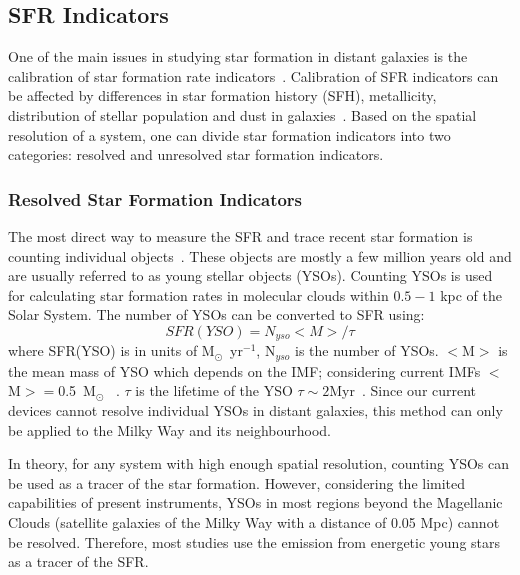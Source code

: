 \subsection{SFR Indicators}

One of the main issues in studying star formation in distant galaxies is the calibration of star formation rate indicators~\citep[e.g.,][]{Lee10}. 
Calibration of SFR indicators can be affected by differences in star formation history (SFH), metallicity, distribution of stellar population and dust in galaxies~\citep{Calzetti13}. 
Based on the spatial resolution of a system, one can divide star formation indicators into two categories: resolved and unresolved star formation indicators.

\subsubsection{Resolved Star Formation Indicators}
The most direct way to measure the SFR and trace recent star formation is counting individual objects~\citep{Kennicutt12}. 
These objects are mostly a few million years old and  are usually referred to as young stellar objects (YSOs). 
Counting YSOs is used for calculating star formation rates in molecular clouds within $0.5- 1$ kpc of the Solar System. 
The number of YSOs can be converted to SFR using: 
\begin{equation}
SFR(YSO) = N_{yso} <M>/\tau 
\end{equation}
where SFR(YSO) is in units of M$_{\odot}$~yr$^{-1}$, N$_{yso}$ is the number of YSOs.
$<$M$>$ is the mean mass of YSO which depends on the IMF; considering current IMFs $<$M$> = $0.5~M$_{\odot}$ ~\citep[][]{Kennicutt12}. 
$\tau$ is the lifetime of the YSO  $\tau \sim 2$Myr~\citep{Evans09}. 
Since our current devices cannot resolve individual YSOs in distant galaxies, this method can only be applied to the Milky Way and its neighbourhood. 

In theory, for any system with high enough spatial resolution, counting YSOs can be used as a tracer of the star formation. 
However, considering the limited capabilities of present instruments, YSOs in most regions beyond the Magellanic Clouds (satellite galaxies of the Milky Way with a distance of 0.05 Mpc) cannot be resolved. 
Therefore, most studies use the emission from energetic young stars as a tracer of the SFR. 
